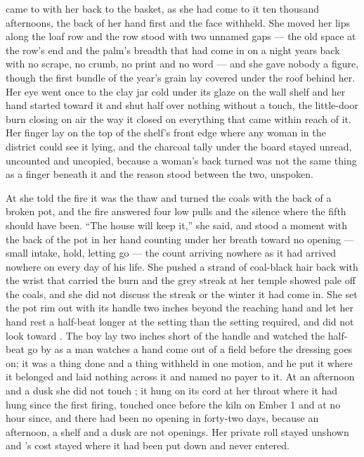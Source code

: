  came to  with her back to the basket, as she had come to it ten thousand afternoons, the back of her hand first and the face withheld. She moved her lips along the loaf row and the row stood with two unnamed gaps --- the old space at the row's end and the palm's breadth that had come in on a night years back with no scrape, no crumb, no print and no word --- and she gave nobody a figure, though the first bundle of the year's grain lay covered under the roof behind her. Her eye went once to the clay jar cold under its glaze on the wall shelf and her hand started toward it and shut half over nothing without a touch, the little-door burn closing on air the way it closed on everything that came within reach of it. Her finger lay on the top of the shelf's front edge where any woman in the district could see it lying, and the charcoal tally under the board stayed unread, uncounted and uncopied, because a woman's back turned was not the same thing as a finger beneath it and the reason stood between the two, unspoken.

At  she told the fire it was the thaw and turned the coals with the back of a broken pot, and the fire answered four low pulls and the silence where the fifth should have been. “The house will keep it,” she said, and stood a moment with the back of the pot in her hand counting under her breath toward no opening --- small intake, hold, letting go --- the count arriving nowhere as it had arrived nowhere on every day of his life. She pushed a strand of coal-black hair back with the wrist that carried the burn and the grey streak at her temple showed pale off the coals, and she did not discuss the streak or the winter it had come in. She set the pot rim out with its handle two inches beyond the reaching hand and let her hand rest a half-beat longer at the setting than the setting required, and did not look toward . The boy lay two inches short of the handle and watched the half-beat go by as a man watches a hand come out of a field before the dressing goes on; it was a thing done and a thing withheld in one motion, and he put it where it belonged and laid nothing across it and named no payer to it. At an afternoon and a dusk she did not touch ; it hung on its cord at her throat where it had hung since the first firing, touched once before the kiln on Ember 1 and at no hour since, and there had been no opening in forty-two days, because an afternoon, a shelf and a dusk are not openings. Her private roll stayed unshown and 's cost stayed where it had been put down and never entered.

